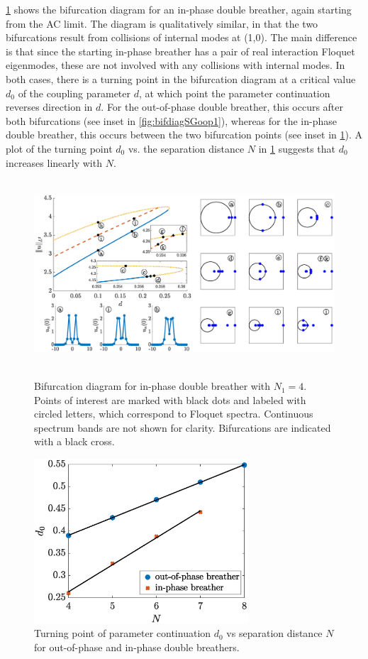 \documentclass[12pt,reqno]{amsart}
\theoremstyle{definition}
\begin{document}
\cref{fig:bifdiagSGip1} shows the bifurcation diagram for an in-phase double breather, again starting from the AC limit. The diagram is qualitatively similar, in that the two bifurcations result from collisions of internal modes at (1,0). The main difference is that since the starting in-phase breather has a pair of real interaction Floquet eigenmodes, these are not involved with any collisions with internal modes. In both cases, there is a turning point in the bifurcation diagram at a critical value $d_0$ of the coupling parameter $d$, at which point the parameter continuation reverses direction in $d$. For the out-of-phase double breather, this occurs after both bifurcations (see inset in \cref{fig:bifdiagSGoop1}), whereas for the in-phase double breather, this occurs between the two bifurcation points (see inset in \cref{fig:bifdiagSGip1}). A plot of the turning point $d_0$ vs. the separation distance $N$ in \cref{fig:bifdiagSGip1} suggests that $d_0$ increases linearly with $N$.

\begin{figure}
	\hbox{
	\hspace{-2cm}
	\includegraphics[width=20cm]{bifdiagSGinphaseN4.eps} 
	}
	\caption{Bifurcation diagram for in-phase double breather with $N_1 = 4$. Points of interest are marked with black dots and labeled with circled letters, which correspond to Floquet spectra. Continuous spectrum bands are not shown for clarity. Bifurcations are indicated with a black cross. }
	\label{fig:bifdiagSGip1}
\end{figure}

\begin{figure}
	\begin{center}
	\includegraphics[width=8cm]{doubled0vsN.eps} 
	\end{center}
	\caption{Turning point of parameter continuation $d_0$ vs separation distance $N$ for out-of-phase and in-phase double breathers.}
	\label{fig:SGd0}
\end{figure}
\end{document}
